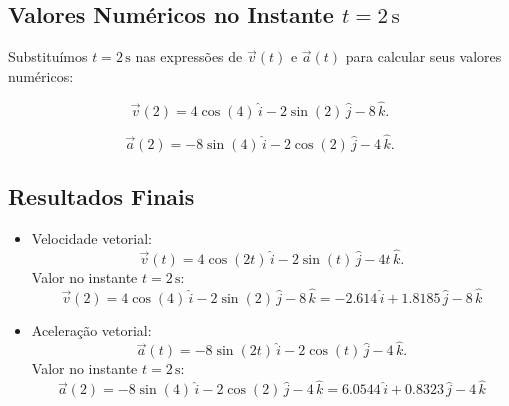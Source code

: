 \subsection*{Valores Numéricos no Instante \(t = 2 \, \text{s}\)}
Substituímos \(t = 2 \, \text{s}\) nas expressões de \(\vec{v}(t)\) e \(\vec{a}(t)\) para calcular seus valores numéricos:

\[
\vec{v}(2) = 4 \cos(4) \, \hat{i} - 2 \sin(2) \, \hat{j} - 8 \, \hat{k}.
\]

\[
\vec{a}(2) = -8 \sin(4) \, \hat{i} - 2 \cos(2) \, \hat{j} - 4 \, \hat{k}.
\]

\subsection*{Resultados Finais}
\begin{itemize}
    \item Velocidade vetorial:
    \[
    \vec{v}(t) = 4 \cos(2t) \, \hat{i} - 2 \sin(t) \, \hat{j} - 4t \, \hat{k}.
    \]
    Valor no instante \(t = 2 \, \text{s}\):
    \[
    \vec{v}(2) = 4 \cos(4) \, \hat{i} - 2 \sin(2) \, \hat{j} - 8 \, \hat{k} = -2.614 \,\hat{i} + 1.8185 \,\hat{j} - 8\,\hat{k}
    \]

    \item Aceleração vetorial:
    \[
    \vec{a}(t) = -8 \sin(2t) \, \hat{i} - 2 \cos(t) \, \hat{j} - 4 \, \hat{k}.
    \]
    Valor no instante \(t = 2 \, \text{s}\):
    \[
    \vec{a}(2) = -8 \sin(4) \, \hat{i} - 2 \cos(2) \, \hat{j} - 4 \, \hat{k} = 6.0544 \,\hat{i} + 0.8323 \,\hat{j} - 4\,\hat{k}
    \]
\end{itemize}
